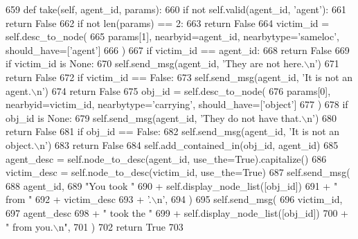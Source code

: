 \begin{DoxyCode}
659     \textcolor{keyword}{def }take(self, agent\_id, params):
660         \textcolor{keywordflow}{if} \textcolor{keywordflow}{not} self.valid(agent\_id, \textcolor{stringliteral}{'agent'}):
661             \textcolor{keywordflow}{return} \textcolor{keyword}{False}
662         \textcolor{keywordflow}{if} \textcolor{keywordflow}{not} len(params) == 2:
663             \textcolor{keywordflow}{return} \textcolor{keyword}{False}
664         victim\_id = self.desc\_to\_node(
665             params[1], nearbyid=agent\_id, nearbytype=\textcolor{stringliteral}{'sameloc'}, should\_have=[\textcolor{stringliteral}{'agent'}]
666         )
667         \textcolor{keywordflow}{if} victim\_id == agent\_id:
668             \textcolor{keywordflow}{return} \textcolor{keyword}{False}
669         \textcolor{keywordflow}{if} victim\_id \textcolor{keywordflow}{is} \textcolor{keywordtype}{None}:
670             self.send\_msg(agent\_id, \textcolor{stringliteral}{'They are not here.\(\backslash\)n'})
671             \textcolor{keywordflow}{return} \textcolor{keyword}{False}
672         \textcolor{keywordflow}{if} victim\_id == \textcolor{keyword}{False}:
673             self.send\_msg(agent\_id, \textcolor{stringliteral}{'It is not an agent.\(\backslash\)n'})
674             \textcolor{keywordflow}{return} \textcolor{keyword}{False}
675         obj\_id = self.desc\_to\_node(
676             params[0], nearbyid=victim\_id, nearbytype=\textcolor{stringliteral}{'carrying'}, should\_have=[\textcolor{stringliteral}{'object'}]
677         )
678         \textcolor{keywordflow}{if} obj\_id \textcolor{keywordflow}{is} \textcolor{keywordtype}{None}:
679             self.send\_msg(agent\_id, \textcolor{stringliteral}{'They do not have that.\(\backslash\)n'})
680             \textcolor{keywordflow}{return} \textcolor{keyword}{False}
681         \textcolor{keywordflow}{if} obj\_id == \textcolor{keyword}{False}:
682             self.send\_msg(agent\_id, \textcolor{stringliteral}{'It is not an object.\(\backslash\)n'})
683             \textcolor{keywordflow}{return} \textcolor{keyword}{False}
684         self.add\_contained\_in(obj\_id, agent\_id)
685         agent\_desc = self.node\_to\_desc(agent\_id, use\_the=\textcolor{keyword}{True}).capitalize()
686         victim\_desc = self.node\_to\_desc(victim\_id, use\_the=\textcolor{keyword}{True})
687         self.send\_msg(
688             agent\_id,
689             \textcolor{stringliteral}{"You took "}
690             + self.display\_node\_list([obj\_id])
691             + \textcolor{stringliteral}{" from "}
692             + victim\_desc
693             + \textcolor{stringliteral}{'.\(\backslash\)n'},
694         )
695         self.send\_msg(
696             victim\_id,
697             agent\_desc
698             + \textcolor{stringliteral}{" took the "}
699             + self.display\_node\_list([obj\_id])
700             + \textcolor{stringliteral}{" from you.\(\backslash\)n"},
701         )
702         \textcolor{keywordflow}{return} \textcolor{keyword}{True}
703 
\end{DoxyCode}
